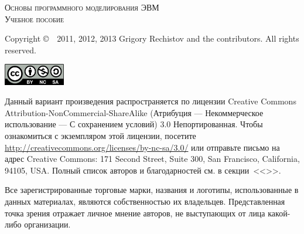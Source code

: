 
\newlength{\centeroffset}
\setlength{\centeroffset}{-0.5\oddsidemargin}
\addtolength{\centeroffset}{0.5\evensidemargin}

\thispagestyle{empty}

\begin{center}
	{\Huge\textsc{Основы программного моделирования ЭВМ}}
	\vspace{1cm}\\
	{\Large\textsc{Учебное пособие}}
\end{center}

\noindent\hspace*{\centeroffset}
\pagebreak

\thispagestyle{empty}
\begin{small} 
Copyright \copyright~~2011, 2012, 2013 Grigory Rechistov and the contributors.  All rights reserved.
\begin{center}
	\includegraphics[width=0.2\textwidth]{../cc-by-nc-sa.png}
\end{center}

Данный вариант произведения распространяется по лицензии Creative Commons At\-tri\-bu\-tion-Non\-Com\-mer\-cial-Share\-Alike (Атрибуция — Некоммерческое использование — С сохранением условий) 3.0 Непортированная. Чтобы ознакомиться с экземпляром этой лицензии, посетите \url{http://creativecommons.org/licenses/by-nc-sa/3.0/} или отправьте письмо на адрес Creative Commons: 171 Second Street, Suite 300, San Francisco, California, 94105, USA. 
Полный список авторов и благодарностей см. в секции~<<>>.

Все зарегистрированные торговые марки, названия и логотипы, использованные в данных материалах, являются собственностью их владельцев. Представленная точка зрения отражает личное мнение авторов, не выступающих от лица какой-либо организации.
\end{small}

